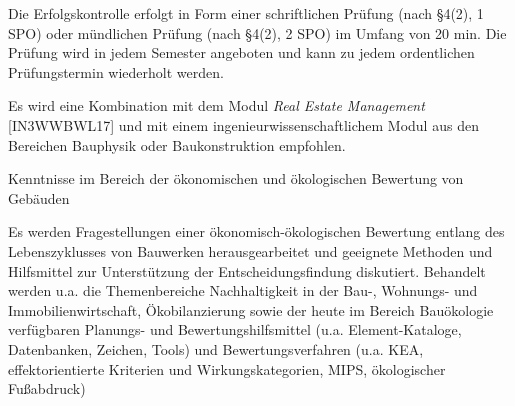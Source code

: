 \begin{course}

\setdoclanguagegerman
{}



\coursehead


\label{cour_6881.dp_997}


\begin{styleenv}
\begin{assessment}
Die Erfolgskontrolle erfolgt in Form einer schriftlichen Prüfung (nach §4(2), 1 SPO) oder mündlichen Prüfung (nach §4(2), 2 SPO) im Umfang von 20 min.\newline
Die Prüfung wird in jedem Semester angeboten und kann zu jedem ordentlichen Prüfungstermin wiederholt werden.


\end{assessment}

\begin{conditions}Es wird eine Kombination mit dem Modul \emph{Real Estate Management} [IN3WWBWL17] und mit einem ingenieurwissenschaftlichem Modul aus den Bereichen Bauphysik oder Baukonstruktion empfohlen.

\end{conditions}


\end{styleenv}

\begin{learningoutcomes}
Kenntnisse im Bereich der ökonomischen und ökologischen Bewertung von Gebäuden


\end{learningoutcomes}

\begin{content}
Es werden Fragestellungen einer ökonomisch-ökologischen Bewertung entlang des Lebenszyklusses von Bauwerken herausgearbeitet und geeignete Methoden und Hilfsmittel zur Unterstützung der Entscheidungsfindung diskutiert. Behandelt werden u.a. die Themenbereiche Nachhaltigkeit in der Bau-, Wohnungs- und Immobilienwirtschaft, Ökobilanzierung sowie der heute im Bereich Bauökologie verfügbaren Planungs- und Bewertungshilfsmittel (u.a. Element-Kataloge, Datenbanken, Zeichen, Tools) und Bewertungsverfahren (u.a. KEA, effektorientierte Kriterien und Wirkungskategorien, MIPS, ökologischer Fußabdruck)



\end{content}
\end{course}
